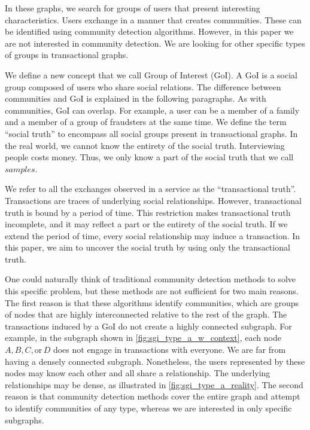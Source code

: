 \documentclass{llncs}
\begin{document}
In these graphs, we search for groups of users that present interesting characteristics.
Users exchange in a manner that creates communities.
These can be identified using community detection algorithms.
However, in this paper we are not interested in community detection.
We are looking for other specific types of groups in transactional graphs.

We define a new concept that we call Group of Interest (GoI).
A GoI is a social group composed of users who share social relations.
The difference between communities and GoI is explained in the following paragraphs.
As with communities, GoI can overlap.
For example, a user can be a member of a family and a member of a group of fraudsters at the same time.
We define the term ``social truth'' to encompass all social groups present in transactional graphs.
In the real world, we cannot know the entirety of the social truth.
Interviewing people costs money.
Thus, we only know a part of the social truth that we call \(samples\).

We refer to all the exchanges observed in a service as the ``transactional truth''.
Transactions are traces of underlying social relationships.
However, transactional truth is bound by a period of time.
This restriction makes transactional truth incomplete, and it may reflect a part or the entirety of the social truth.
If we extend the period of time, every social relationship may induce a transaction.
In this paper, we aim to uncover the social truth by using only the transactional truth.

One could naturally think of traditional community detection methods to solve this specific problem, but these methods are not sufficient for two main reasons.
The first reason is that these algorithms identify communities, which are groups of nodes that are highly interconnected relative to the rest of the graph.
The transactions induced by a GoI do not create a highly connected subgraph.
For example, in the subgraph shown in \autoref{fig:sgi_type_a_w_context}, each node \(A,B,C, \text{or}\, D\) does not engage in transactions with everyone.
We are far from having a densely connected subgraph.
Nonetheless, the users represented by these nodes may know each other and all share a relationship.
The underlying relationships may be dense, as illustrated in \autoref{fig:sgi_type_a_reality}.
The second reason is that community detection methods cover the entire graph and attempt to identify communities of any type, whereas we are interested in only specific subgraphs.
\end{document}

